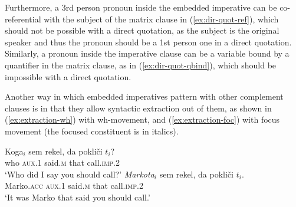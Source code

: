 \documentclass[output=paper,colorlinks,citecolor=brown]{langscibook}
\begin{document}
Furthermore, a 3rd person pronoun inside the embedded imperative can be co-referential with the subject of the matrix clause in (\ref{ex:dir-quot-ref}), which should not be possible with a direct quotation, as the subject is the original speaker and thus the pronoun should be a 1st person one in a direct quotation. Similarly, a pronoun inside the imperative clause can be a variable bound by a quantifier in the matrix clause, as in (\ref{ex:dir-quot-qbind}), which should be impossible with a direct quotation.    
\ea {}\label{ex:dir-quot}
\z\z   

\noindent Another way in which embedded imperatives pattern with other complement clauses is in that they allow syntactic extraction out of them, as shown in (\ref{ex:extraction-wh}) with wh-movement, and (\ref{ex:extraction-foc}) with focus movement (the focused constituent is in italics).

\ea\label{ex:extraction} 
\ea \gll Koga$_i$ sem rekel, da pokli\v{c}i $t_i$?\\
         who \textsc{aux.1} said.\textsc{m} that call.\textsc{imp.2} {}\\
     \glt `Who did I say you should call?' \label{ex:extraction-wh}    
\ex \gll \emph{Markota}$_i$ sem rekel, da pokli\v{c}i $t_i$.\\
         Marko.\textsc{acc} \textsc{aux.1} said.\textsc{m} that call.\textsc{imp.2} {}\\
     \glt `It was Marko that said you should call.'\\\hfill \citep[643]{stegoveckaufmann}\label{ex:extraction-foc}
\z\z
\end{document}

